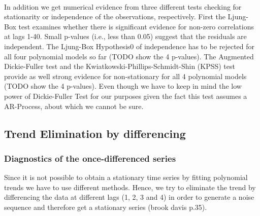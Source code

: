 \documentclass[11pt,a4paper]{article}
\begin{document}
\\In addition we get numerical evidence from three different tests checking for stationarity or independence of the observations, respectively. First the Ljung-Box test examines whether there is significant evidence for non-zero correlations at lags 1-40. Small p-values (i.e., less than 0.05) suggest that the residuals are independent. The Ljung-Box Hypothesis0 of independence has to be rejected for all four polynomial models so far (TODO show the 4 p-values). The Augmented Dickie-Fuller test and the Kwiatkowski-Phillips-Schmidt-Shin (KPSS) test provide as well strong evidence for non-stationary for all 4 polynomial models (TODO show the 4 p-values). Even though we have to keep in mind the low power of Dickie-Fuller Test for our purposes given the fact this test assumes a AR-Process, about which we cannot be sure.

\subsection{Trend Elimination by differencing}

\subsubsection{Diagnostics of the once-differenced series}
Since it is not possible to obtain a stationary time series by fitting polynomial trends we have to use different methods. Hence, we try to eliminate the trend by differencing the data at different lags (1, 2, 3 and 4) in order to generate a noise sequence and therefore get a stationary series (brook davis p.35). 
\end{document}
